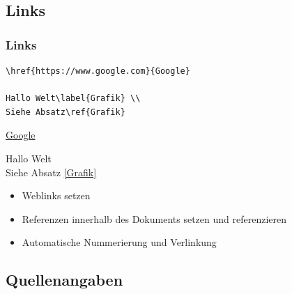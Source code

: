 \documentclass[aspectratio=169]{beamer}
\begin{document}
\subsection{Links}

\begin{frame}[fragile]
\frametitle{Links}

\begin{lstlisting}[language={[latex]TeX}]
\href{https://www.google.com}{Google}

Hallo Welt\label{Grafik} \\
Siehe Absatz\ref{Grafik}
\end{lstlisting}

\vspace{1em}

\href{https://www.google.com}{Google}

Hallo Welt\label{Grafik} \\
Siehe Absatz \ref{Grafik}

\vspace{1em}

\begin{itemize}
  \item Weblinks setzen
  \item Referenzen innerhalb des Dokuments setzen und referenzieren
  \item Automatische Nummerierung und Verlinkung
\end{itemize}

\end{frame}


\subsection{Quellenangaben}
\end{document}
